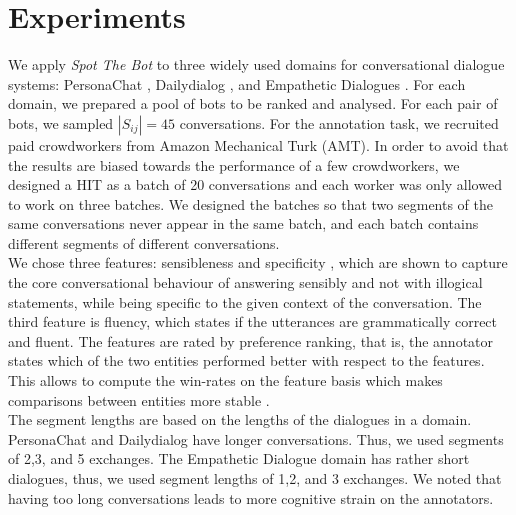 \documentclass[11pt,a4paper]{article}
\begin{document}
\section{Experiments}
We apply \emph{Spot The Bot} to three widely used domains for conversational dialogue systems: PersonaChat \cite{zhang-etal-2018-personalizing}, Dailydialog \cite{li-etal-2017-dailydialog}, and Empathetic Dialogues \cite{rashkin-etal-2019-towards}. For each domain, we prepared a pool of bots to be ranked and analysed. For each pair of bots, we sampled $|S_{ij}| = 45$ conversations. For the annotation task, we recruited paid crowdworkers from Amazon Mechanical Turk (AMT). In order to avoid that the results are biased towards the performance of a few crowdworkers, we designed a HIT as a batch of 20 conversations and each worker was only allowed to work on three batches. We designed the batches so that two segments of the same conversations never appear in the same batch, and each batch contains different segments of different conversations.  \\
 We chose three features: sensibleness and specificity \cite{adiwardana2020towards}, which are shown to capture the core conversational behaviour of answering sensibly and not with illogical statements, while being specific to the given context of the conversation. The third feature is fluency, which states if the utterances are grammatically correct and fluent. The features are rated by preference ranking, that is, the annotator states which of the two entities performed better with respect to the features. This allows to compute the win-rates on the feature basis which makes comparisons between entities more stable \cite{yannakakis2011ranking}. \\
 The segment lengths are based on the lengths of the dialogues in a domain. PersonaChat and Dailydialog have longer conversations. Thus, we used segments of 2,3, and 5 exchanges. The Empathetic Dialogue domain has rather short dialogues, thus, we used segment lengths of 1,2, and 3 exchanges. We noted that having too long conversations leads to more cognitive strain on the annotators. 
\end{document}
